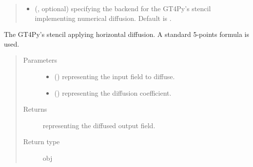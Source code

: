 \documentclass[letterpaper,10pt,english]{sphinxmanual}
\begin{document}
\begin{fulllineitems}
\begin{fulllineitems}
\begin{quote}
\begin{description}
\begin{itemize}
\item {} 
 (, optional) \textendash{}  specifying the backend for the GT4Py’s stencil implementing numerical
diffusion. Default is .

\end{itemize}

\end{description}\end{quote}

\end{fulllineitems}


\begin{fulllineitems}
\label{\detokenize{api:dycore.diffusion.DiffusionXYZ._defs_stencil}}
The GT4Py’s stencil applying horizontal diffusion. A standard 5-points formula is used.
\begin{quote}\begin{description}
\item[{Parameters}] \leavevmode\begin{itemize}
\item {} 
 () \textendash{}  representing the input field to diffuse.

\item {} 
 () \textendash{}  representing the diffusion coefficient.

\end{itemize}

\item[{Returns}] \leavevmode
{} representing the diffused output field.

\item[{Return type}] \leavevmode
obj

\end{description}\end{quote}

\end{fulllineitems}



\end{fulllineitems}
\end{document}
